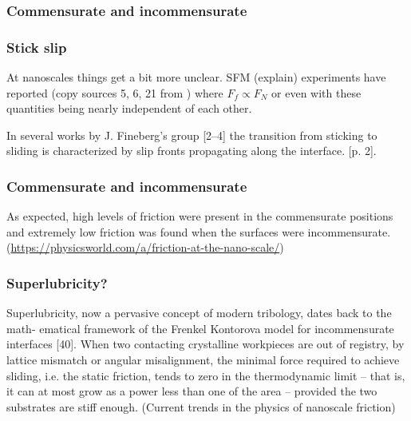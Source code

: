 


\subsubsection{Commensurate and incommensurate}
\subsubsection{Stick slip}



At nanoscales things get a bit more unclear. SFM (explain) experiments have reported (copy sources 5, 6, 21 from \cite{mo_friction_2009})
where $F_f \propto F_N$ or even with these quantities being nearly independent of each other.








In several works by J. Fineberg’s group [2–4] the transition from sticking to sliding is characterized by slip fronts propagating along the
interface. \cite{Manini_2017}[p. 2]. 

\subsubsection{Commensurate and incommensurate}
As expected, high levels of friction were present in the commensurate positions and extremely low friction was found when the surfaces were
incommensurate. (\url{https://physicsworld.com/a/friction-at-the-nano-scale/})


\subsubsection{Superlubricity?}
Superlubricity, now a pervasive concept of modern tribology, dates back to the math- ematical framework of the Frenkel Kontorova model for
incommensurate interfaces [40]. When two contacting crystalline workpieces are out of registry, by lattice mismatch or angular misalignment,
the minimal force required to achieve sliding, i.e. the static friction, tends to zero in the thermodynamic limit – that is, it can at most
grow as a power less than one of the area – provided the two substrates are stiff enough. (Current trends in the physics of nanoscale
friction)


